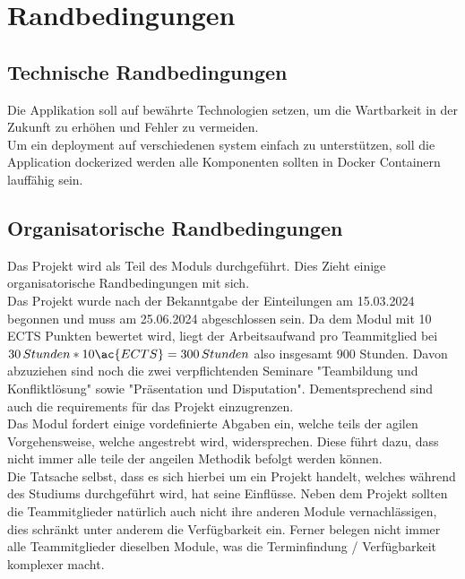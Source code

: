 \chapter{Randbedingungen}\label{ch:randbedingungen}


\section{Technische Randbedingungen}\label{sec:technische-randbedingungen}

Die Applikation soll auf bewährte Technologien setzen, um die Wartbarkeit in der Zukunft zu erhöhen und Fehler zu vermeiden.\\

Um ein deployment auf verschiedenen system einfach zu unterstützen, soll die Application dockerized werden
\dah alle Komponenten sollten in Docker Containern lauffähig sein.


\section{Organisatorische Randbedingungen}\label{sec:organisatorische-randbedingungen}

Das Projekt \workTitel wird als Teil des Moduls \workTyp durchgeführt.
Dies Zieht einige organisatorische Randbedingungen mit sich.\\
Das Projekt wurde nach der Bekanntgabe der Einteilungen am 15.03.2024 begonnen und muss am 25.06.2024 abgeschlossen sein.
Da dem Modul mit 10 \ac{ECTS} Punkten bewertet wird, liegt der Arbeitsaufwand pro Teammitglied bei \(30\,Stunden * 10 \ac{ECTS} = 300\,Stunden\) also insgesamt 900 Stunden.
Davon abzuziehen sind noch die zwei verpflichtenden Seminare "Teambildung und Konfliktlösung" sowie "Präsentation und Disputation".
Dementsprechend sind auch die requirements für das Projekt einzugrenzen.\\

Das Modul fordert einige vordefinierte Abgaben ein, welche teils der agilen Vorgehensweise, welche angestrebt wird, widersprechen.
Diese führt dazu, dass nicht immer alle teile der angeilen Methodik befolgt werden können.\\

Die Tatsache selbst, dass es sich hierbei um ein Projekt handelt, welches während des Studiums durchgeführt wird, hat seine Einflüsse.
Neben dem Projekt sollten die Teammitglieder natürlich auch nicht ihre anderen Module vernachlässigen, dies schränkt unter anderem die Verfügbarkeit ein.
Ferner belegen nicht immer alle Teammitglieder dieselben Module, was die Terminfindung / Verfügbarkeit komplexer macht.